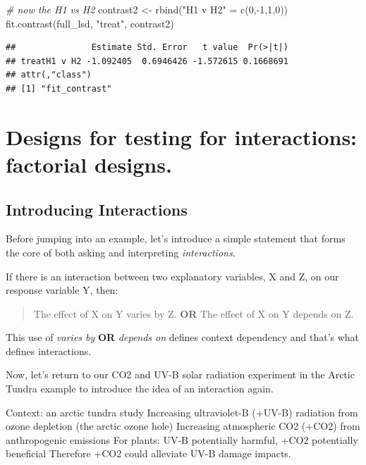 \documentclass[
]{book}
\newenvironment{Shaded}{\begin{snugshade}}{\end{snugshade}}
\newcommand{\CommentTok}[1]{\textcolor[rgb]{0.56,0.35,0.01}{\textit{#1}}}
\newcommand{\DecValTok}[1]{\textcolor[rgb]{0.00,0.00,0.81}{#1}}
\newcommand{\FunctionTok}[1]{\textcolor[rgb]{0.00,0.00,0.00}{#1}}
\newcommand{\NormalTok}[1]{#1}
\newcommand{\OtherTok}[1]{\textcolor[rgb]{0.56,0.35,0.01}{#1}}
\newcommand{\SpecialCharTok}[1]{\textcolor[rgb]{0.00,0.00,0.00}{#1}}
\newcommand{\StringTok}[1]{\textcolor[rgb]{0.31,0.60,0.02}{#1}}
\begin{document}
\begin{Shaded}
\begin{Highlighting}[]
\CommentTok{\# now the H1 vs H2}
\NormalTok{contrast2 }\OtherTok{\textless{}{-}} \FunctionTok{rbind}\NormalTok{(}\StringTok{"H1 v H2"} \OtherTok{=} \FunctionTok{c}\NormalTok{(}\DecValTok{0}\NormalTok{,}\SpecialCharTok{{-}}\DecValTok{1}\NormalTok{,}\DecValTok{1}\NormalTok{,}\DecValTok{0}\NormalTok{))}
\FunctionTok{fit.contrast}\NormalTok{(full\_lsd, }\StringTok{"treat"}\NormalTok{, contrast2)}
\end{Highlighting}
\end{Shaded}

\begin{verbatim}
##               Estimate Std. Error   t value  Pr(>|t|)
## treatH1 v H2 -1.092405  0.6946426 -1.572615 0.1668691
## attr(,"class")
## [1] "fit_contrast"
\end{verbatim}

\hypertarget{designs-for-testing-for-interactions-factorial-designs.}{%
\chapter{Designs for testing for interactions: factorial designs.}\label{designs-for-testing-for-interactions-factorial-designs.}}

\hypertarget{introducing-interactions}{%
\section{Introducing Interactions}\label{introducing-interactions}}

Before jumping into an example, let's introduce a simple statement that forms the core of both asking and interpreting \emph{interactions}.

If there is an interaction between two explanatory variables, X and Z, on our response variable Y, then:

\begin{quote}
The effect of X on Y varies by Z. \textbf{OR} The effect of X on Y depends on Z.
\end{quote}

This use of \emph{varies by} \textbf{OR} \emph{depends on} defines context dependency and that's what defines interactions.

Now, let's return to our CO2 and UV-B solar radiation experiment in the Arctic Tundra example to introduce the idea of an interaction again.

Context: an arctic tundra study
Increasing ultraviolet-B (+UV-B) radiation from ozone depletion (the arctic ozone hole)
Increasing atmospheric CO2 (+CO2) from anthropogenic emissions
For plants: UV-B potentially harmful, +CO2 potentially beneficial
Therefore +CO2 could alleviate UV-B damage impacts.
\end{document}
